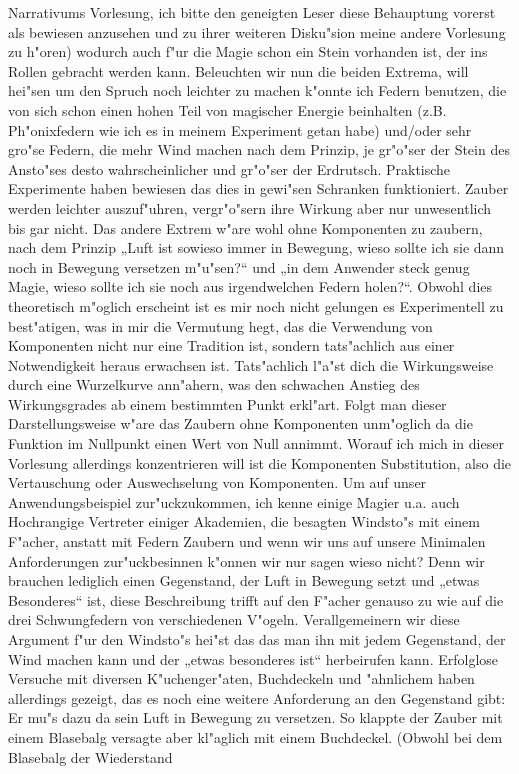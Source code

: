 \documentclass[a5paper,8pt]{book}
\begin{document}
Narrativums Vorlesung, ich bitte den geneigten Leser diese Behauptung vorerst als bewiesen anzusehen und zu ihrer weiteren Disku"sion meine andere Vorlesung zu h"oren) wodurch auch f"ur die Magie schon ein Stein vorhanden ist, der ins Rollen gebracht werden kann.
Beleuchten wir nun die beiden Extrema, will hei"sen um den Spruch noch leichter zu machen k"onnte ich Federn benutzen, die von sich schon einen hohen Teil von magischer Energie beinhalten (z.B. Ph"onixfedern wie ich es in meinem Experiment getan habe) und/oder sehr gro"se Federn, die mehr Wind machen nach dem Prinzip, je gr"o"ser der Stein des Ansto"ses desto wahrscheinlicher und gr"o"ser der Erdrutsch. Praktische Experimente haben bewiesen das dies in gewi"sen Schranken funktioniert. Zauber werden leichter auszuf"uhren, vergr"o"sern ihre Wirkung aber nur unwesentlich bis gar nicht.
Das andere Extrem w"are wohl ohne Komponenten zu zaubern, nach dem Prinzip „Luft ist sowieso immer in Bewegung, wieso sollte ich sie dann noch in Bewegung versetzen m"u"sen?“ und „in dem Anwender steck genug Magie, wieso sollte ich sie noch aus irgendwelchen Federn holen?“. Obwohl dies theoretisch m"oglich erscheint ist es mir noch nicht gelungen es Experimentell zu best"atigen, was in mir die Vermutung hegt, das die Verwendung von Komponenten nicht nur eine Tradition ist, sondern tats"achlich aus einer Notwendigkeit heraus erwachsen ist. Tats"achlich l"a"st dich die Wirkungsweise durch eine Wurzelkurve ann"ahern, was den schwachen Anstieg des Wirkungsgrades ab einem bestimmten Punkt erkl"art. Folgt man dieser Darstellungsweise w"are das Zaubern ohne Komponenten unm"oglich da die Funktion im Nullpunkt einen Wert von Null annimmt.
Worauf ich mich in dieser Vorlesung allerdings konzentrieren will ist die Komponenten Substitution, also die Vertauschung oder Auswechselung von Komponenten.
Um auf unser Anwendungsbeispiel zur"uckzukommen, ich kenne einige Magier u.a. auch Hochrangige Vertreter einiger Akademien, die besagten Windsto"s mit einem F"acher, anstatt mit Federn Zaubern und wenn wir uns auf unsere Minimalen Anforderungen zur"uckbesinnen k"onnen wir nur sagen wieso nicht? Denn wir brauchen lediglich einen Gegenstand, der Luft in Bewegung setzt und „etwas Besonderes“ ist, diese Beschreibung trifft auf den F"acher genauso zu wie auf die drei Schwungfedern von verschiedenen V"ogeln. Verallgemeinern wir diese Argument f"ur den Windsto"s hei"st das das man ihn mit jedem Gegenstand, der Wind machen kann und der „etwas besonderes ist“ herbeirufen kann. Erfolglose Versuche mit diversen K"uchenger"aten, Buchdeckeln und "ahnlichem haben allerdings gezeigt, das es noch eine weitere Anforderung an den Gegenstand gibt: Er mu"s dazu da sein Luft in Bewegung zu versetzen. So klappte der Zauber mit einem Blasebalg versagte aber kl"aglich mit einem Buchdeckel. (Obwohl bei dem Blasebalg der Wiederstand 
\end{document}
